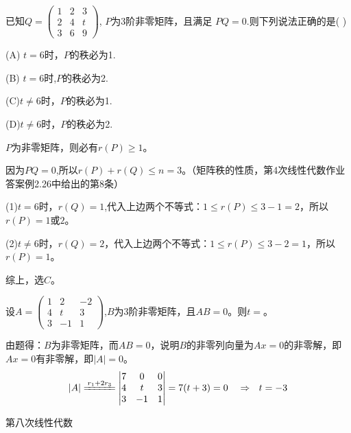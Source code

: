 \documentclass[a4paper]{report}
\begin{document}
\EX 已知$Q=
\begin{pmatrix}
1&2&3\\
2&4&t\\
3&6&9
\end{pmatrix}
$,
$P$为3阶非零矩阵，且满足
$PQ=0$.则下列说法正确的是( )

(A) $t=6$时，$P$的秩必为1.

(B) $t=6$时,$P$的秩必为2.

(C)$t\neq 6$时，$P$的秩必为1.

(D)$t\neq6$时，$P$的秩必为2.

\begin{jie}
$P$为非零矩阵，则必有$r(P)\geq 1$。

因为$PQ=0$,所以$r(P)+r(Q)\leq n=3$。（矩阵秩的性质，第4次线性代数作业答案例2.26中给出的第8条）

(1)$t=6$时，$r(Q)=1$,代入上边两个不等式：$1\leq r(P)\leq 3-1=2$，所以$r(P)=1$或$2$。

(2)$t\neq 6$时，$r(Q)=2$，代入上边两个不等式：$1\leq r(P)\leq 3-2=1$，所以$r(P)=1$。

综上，选$C$。
\end{jie}

\EX 设$A=
\begin{pmatrix}
1&2&-2\\
4&t&3\\
3&-1&1
\end{pmatrix}
$,$B$为3阶非零矩阵，且$AB=0$。则$t=$\underline{\hphantom{~~~~~~~~}}。

\begin{jie}
由题得：$B$为非零矩阵，而$AB=0$，说明$B$的非零列向量为$Ax=0$的非零解，即$Ax=0$有非零解，即$|A|=0$。
\begin{equation*}
|A|\xlongequal{r_1+2r_3}
\begin{vmatrix}
7&0&0\\
4&t&3\\
3&-1&1
\end{vmatrix}=7(t+3)=0~~~\Rightarrow~~t=-3
\end{equation*}
\end{jie}

\clearpage
\hphantom{~~}\hfill {\heiti 第八次线性代数} \hfill\hphantom{~~}

\hphantom{~~}
\end{document}
